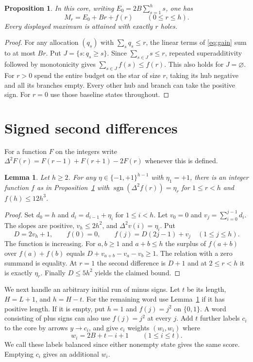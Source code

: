 \documentclass[11pt]{article}
\newtheorem{lemma}[theorem]{Lemma}
\newtheorem{proposition}[theorem]{Proposition}
\theoremstyle{definition}\newtheorem{example}[theorem]{Example}
\newcommand{\sig}{\operatorname{sgn}}
\newcommand{\Dtwo}{\Delta^2}
\begin{document}
\begin{proposition}\label{prop:profile}
In this core, writing $E_0=2B\sum_{s=1}^h s$, one has
\begin{equation}\label{eq:profile}
 M_r=E_0+Br+f(r)\qquad(0\le r\le h).
\end{equation}
Every displayed maximum is attained with exactly $r$ holes.
\end{proposition}
\begin{proof}
For any allocation $(q_s)$ with $\sum_s q_s\le r$, the linear terms of \eqref{eq:gain} sum to at most $Br$. Put $J=\{s:q_s\ge s\}$. Since $\sum_{s\in J}s\le r$, repeated superadditivity followed by monotonicity gives $\sum_{s\in J}f(s)\le f(r)$. This also holds for $J=\varnothing$. For $r>0$ spend the entire budget on the star of size $r$, taking its hub negative and all its branches empty. Every other hub and branch can take the positive sign. For $r=0$ use those baseline states throughout.\end{proof}

\section{Signed second differences}
For a function $F$ on the integers write $\Dtwo F(r)=F(r-1)+F(r+1)-2F(r)$ whenever this is defined.

\begin{lemma}\label{lem:bonus}
Let $h\ge2$. For any $\eta\in\{-1,+1\}^{h-1}$ with $\eta_1=+1$, there is an integer function $f$ as in Proposition~\ref{prop:profile} with $\sig(\Dtwo f(r))=\eta_r$ for $1\le r<h$ and $f(h)\le12h^3$.
\end{lemma}
\begin{proof}
Set $d_0=h$ and $d_i=d_{i-1}+\eta_i$ for $1\le i<h$. Let $v_0=0$ and $v_j=\sum_{i=0}^{j-1}d_i$. The slopes are positive, $v_h\le2h^2$, and $\Dtwo v(i)=\eta_i$. Put
\begin{equation}\label{eq:bonus}
 D=2v_h+1,\qquad f(0)=0,\qquad f(j)=D(2j-1)+v_j\quad(1\le j\le h).
\end{equation}
The function is increasing. For $a,b\ge1$ and $a+b\le h$ the surplus of $f(a+b)$ over $f(a)+f(b)$ equals $D+v_{a+b}-v_a-v_b\ge1$. The relation with a zero summand is equality. At $r=1$ the second difference is $D+1$ and at $2\le r<h$ it is exactly $\eta_r$. Finally $D\le5h^2$ yields the claimed bound.\end{proof}

We next handle an arbitrary initial run of minus signs. Let $t$ be its length, $H=L+1$, and $h=H-t$. For the remaining word use Lemma~\ref{lem:bonus} if it has positive length. If it is empty, put $h=1$ and $f(j)=j^2$ on $\{0,1\}$. A word consisting of plus signs can also use $f(j)=j^2$ at every $j$. Add $t$ further labels $c_i$ to the core by arrows $y\to c_i$, and give $c_i$ weights $(w_i,w_i)$ where
\begin{equation}\label{eq:weights}
 w_i=2B+t-i+1\qquad(1\le i\le t).
\end{equation}
We call these labels balanced since either nonempty state gives the same score. Emptying $c_i$ gives an additional $w_i$.
\end{document}
